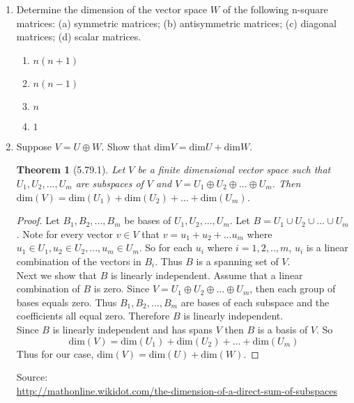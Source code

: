 \documentclass[12pt]{article}
\newtheorem*{theorem}{Theorem} %
\begin{document}
\begin{enumerate}
\item[5.82] Determine the dimension of the vector space $W$ of the following n-square matrices: (a) symmetric matrices; (b) antisymmetric matrices; (c) diagonal matrices; (d) scalar matrices.
	\begin{enumerate}
	\item $n(n+1)$
	\item $n(n-1)$
	\item $n$
	\item $1$
	\end{enumerate}
	
\item[5.79] Suppose $V=U\oplus W$. Show that $\mathrm{dim}V=\mathrm{dim}U+\mathrm{dim}W$.
	\begin{theorem}[5.79.1]
	Let $V$ be a finite dimensional vector space such that $U_1,U_2,...,U_m$ are subspaces of $V$ and $V=U_1\oplus U_2\oplus \dots \oplus U_m$. Then $\mathrm{dim}(V) = \mathrm{dim}(U_1)+\mathrm{dim}(U_2)+\dots+\mathrm{dim}(U_m)$.
	\end{theorem}
	\begin{proof}
	Let $B_1,B_2,...,B_m$ be bases of $U_1,U_2,...,U_m$. Let $B=U_1\cup U_2\cup \dots \cup U_m$. Note for every vector $v\in V$ that $v=u_1+u_2+\dots u_m$ where $u_1\in U_1,u_2\in U_2,...,u_m\in U_m$. So for each $u_i$ where $i=1,2,..,m$, $u_i$ is a linear combination of the vectors in $B_i$. Thus $B $ is a spanning set of $V$.\\
	Next we show that $B$ is linearly independent. Assume that a linear combination of $B$ is zero. Since $V=U_1\oplus U_2 \oplus \dots \oplus U_m$, then each group of bases equals zero. Thus $B_1,B_2,...,B_m$ are bases of each subspace and the coefficients all equal zero. Therefore $B$ is linearly independent.\\
	Since $B$ is linearly independent and has spans $V$ then $B$ is a basis of $V$. So
	\[ \mathrm{dim}(V) = \mathrm{dim}(U_1)+\mathrm{dim}(U_2)+\dots +\mathrm{dim}(U_m) \]
	Thus for our case, $\mathrm{dim}(V) = \mathrm{dim}(U) + \mathrm{dim}(W)$.
	\end{proof}
	Source:\\
	\url{http://mathonline.wikidot.com/the-dimension-of-a-direct-sum-of-subspaces}
\end{enumerate}
\end{document}

